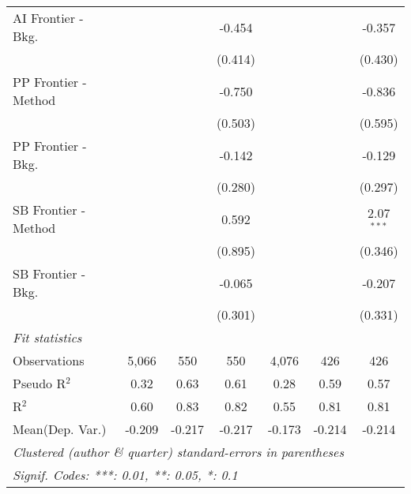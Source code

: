 \begin{tabular}{lcccccc}
   AI Frontier - Bkg.          &         &              & -0.454        &         &            & -0.357\\   
                               &         &              & (0.414)       &         &            & (0.430)\\   
   PP Frontier - Method        &         &              & -0.750        &         &            & -0.836\\   
                               &         &              & (0.503)       &         &            & (0.595)\\   
   PP Frontier - Bkg.          &         &              & -0.142        &         &            & -0.129\\   
                               &         &              & (0.280)       &         &            & (0.297)\\   
   SB Frontier - Method        &         &              & 0.592         &         &            & 2.07$^{***}$\\   
                               &         &              & (0.895)       &         &            & (0.346)\\   
   SB Frontier - Bkg.          &         &              & -0.065        &         &            & -0.207\\   
                               &         &              & (0.301)       &         &            & (0.331)\\   
   \midrule
   \emph{Fit statistics}\\
   Observations                & 5,066   & 550          & 550           & 4,076   & 426        & 426\\  
   Pseudo R$^2$                & 0.32    & 0.63         & 0.61          & 0.28    & 0.59       & 0.57\\  
   R$^2$                       & 0.60    & 0.83         & 0.82          & 0.55    & 0.81       & 0.81\\  
Mean(Dep. Var.) & -0.209 & -0.217 & -0.217 & -0.173 & -0.214 & -0.214 \\
   \midrule \midrule
   \multicolumn{7}{l}{\emph{Clustered (author \& quarter) standard-errors in parentheses}}\\
   \multicolumn{7}{l}{\emph{Signif. Codes: ***: 0.01, **: 0.05, *: 0.1}}\\
\end{tabular}
\par\endgroup
